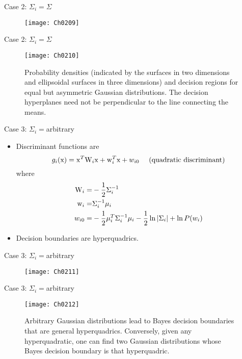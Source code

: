 \begin{frame}{Case 2: $\Sigma_i=\Sigma$}
\begin{figure}
\texttt{[image: Ch0209]}
\end{figure}
\end{frame}

\begin{frame}{Case 2: $\Sigma_i=\Sigma$}
\begin{figure}
\texttt{[image: Ch0210]}
\caption{Probability densities (indicated by the surfaces in two dimensions and ellipsoidal surfaces in three dimensions) and decision regions for equal but asymmetric Gaussian distributions. The decision hyperplanes need not be perpendicular to the line connecting the means.}
\end{figure}
\end{frame}


\begin{frame}{Case 3: $\Sigma_i=$arbitrary}
\begin{itemize}
\item Discriminant functions are
\[g_i({\rm x})={\rm x}^T{\rm W}_i{\rm x}+{\rm w}_i^T{\rm x}+w_{i0}~~~~(\text{quadratic discriminant})\]
where
\begin{align*}
{\rm W}_i=&-\frac{1}{2}\Sigma_i^{-1}\\
{\rm w}_i=&\Sigma_i^{-1}\mu_i\\
w_{i0}=&-\frac{1}{2}\mu_i^T\Sigma_i^{-1}\mu_i-\frac{1}{2}\ln |\Sigma_i|+\ln P(w_i)
\end{align*}
\item Decision boundaries are hyperquadrics.
\end{itemize}
\end{frame}


\begin{frame}{Case 3: $\Sigma_i=$arbitrary}
\begin{figure}
\texttt{[image: Ch0211]}
\end{figure}
\end{frame}

\begin{frame}{Case 3: $\Sigma_i=$arbitrary}
\begin{figure}
\texttt{[image: Ch0212]}
\caption{Arbitrary Gaussian distributions lead to Bayes decision boundaries that are general hyperquadrics. Conversely, given any hyperquadratic, one can find two Gaussian distributions whose Bayes decision boundary is that hyperquadric.}
\end{figure}
\end{frame}

